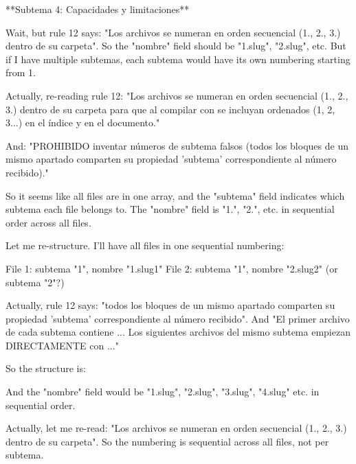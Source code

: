 **Subtema 4: Capacidades y limitaciones**

Wait, but rule 12 says: "Los archivos se numeran en orden secuencial (1., 2., 3.) dentro de su carpeta". So the "nombre" field should be "1.slug", "2.slug", etc. But if I have multiple subtemas, each subtema would have its own numbering starting from 1.

Actually, re-reading rule 12: "Los archivos se numeran en orden secuencial (1., 2., 3.) dentro de su carpeta para que al compilar con  se incluyan ordenados (1, 2, 3...) en el índice y en el documento."

And: "PROHIBIDO inventar números de subtema falsos (todos los bloques de un mismo apartado comparten su propiedad 'subtema' correspondiente al número recibido)."

So it seems like all files are in one array, and the "subtema" field indicates which subtema each file belongs to. The "nombre" field is "1.", "2.", etc. in sequential order across all files.

Let me re-structure. I'll have all files in one sequential numbering:

File 1: subtema "1", nombre "1.slug1"
File 2: subtema "1", nombre "2.slug2" (or subtema "2"?)

Actually, rule 12 says: "todos los bloques de un mismo apartado comparten su propiedad 'subtema' correspondiente al número recibido". And "El primer archivo de cada subtema contiene \secciongrande... Los siguientes archivos del mismo subtema empiezan DIRECTAMENTE con \subtituloA..."

So the structure is:

And the "nombre" field would be "1.slug", "2.slug", "3.slug", "4.slug" etc. in sequential order.

Actually, let me re-read: "Los archivos se numeran en orden secuencial (1., 2., 3.) dentro de su carpeta". So the numbering is sequential across all files, not per subtema.

